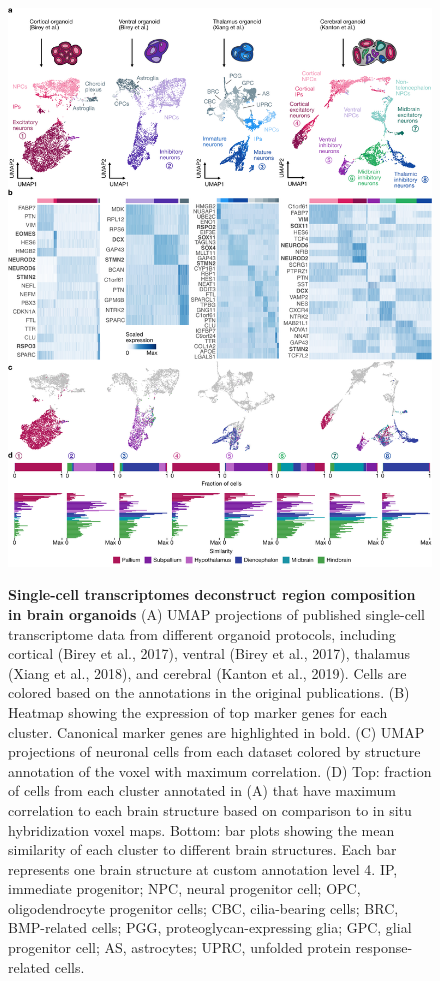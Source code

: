 \begin{figure}[b!]
    \centering
	\includegraphics[width=\textwidth]{figures/voxhunt/Figure_3}
    \label{fig:vox3}
\end{figure}

\begin{figure}[t!]
    \centering
    \caption{\textbf{Single-cell transcriptomes deconstruct region composition in brain organoids} (A) UMAP projections of published single-cell transcriptome data from different organoid protocols, including cortical (Birey et al., 2017), ventral (Birey et al., 2017), thalamus (Xiang et al., 2018), and cerebral (Kanton et al., 2019). Cells are colored based on the annotations in the original publications. (B) Heatmap showing the expression of top marker genes for each cluster. Canonical marker genes are highlighted in bold. (C) UMAP projections of neuronal cells from each dataset colored by structure annotation of the voxel with maximum correlation. (D) Top: fraction of cells from each cluster annotated in (A) that have maximum correlation to each brain structure based on comparison to in situ hybridization voxel maps. Bottom: bar plots showing the mean similarity of each cluster to different brain structures. Each bar represents one brain structure at custom annotation level 4.
    IP, immediate progenitor; NPC, neural progenitor cell; OPC, oligodendrocyte progenitor cells; CBC, cilia-bearing cells; BRC, BMP-related cells; PGG, proteoglycan-expressing glia; GPC, glial progenitor cell; AS, astrocytes; UPRC, unfolded protein response-related cells.}
\end{figure}



